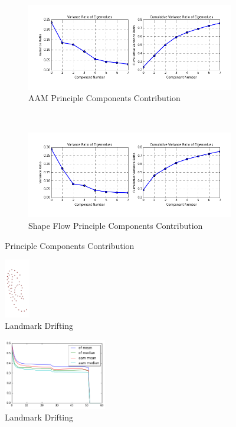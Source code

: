 \begin{figure}[h!]
    \centering
    \begin{subfigure}[b]{0.2\textwidth}
            \includegraphics[width=\textwidth]{resources/aam_ear_eigen_value}
        \caption{AAM Principle Components Contribution}
        \label{}
    \end{subfigure}
    ~~
    \begin{subfigure}[b]{0.2\textwidth}
            \includegraphics[width=\textwidth]{resources/of_ear_eigen_value}
        \caption{Shape Flow Principle Components Contribution}
    \end{subfigure}
    \caption{Principle Components Contribution}
\end{figure}

\begin{figure}[h!]
    \centering
    \includegraphics[width=0.1\textwidth]{resources/landmark_drifting}
    \caption{Landmark Drifting}
\end{figure}

\begin{figure}[h!]
    \centering
    \includegraphics[width=0.4\textwidth]{resources/convergence_test}
    \caption{Landmark Drifting}
\end{figure}

